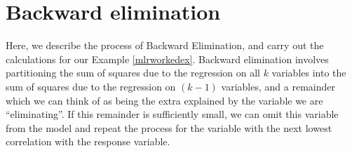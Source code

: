 \documentclass[12pt,a4paper,openany,twoside]{report}
\theoremstyle{definition}
\theoremstyle{remark}
\theoremstyle{plain}
\theoremstyle{definition}
\theoremstyle{definition}
\theoremstyle{definition}
\theoremstyle{remark}
\begin{document}

\hypertarget{backwardelim}{%
\section{Backward elimination}\label{backwardelim}}

Here, we describe the process of Backward Elimination, and carry out the
calculations for our Example \ref{mlrworkedex}.
Backward elimination involves partitioning the sum of squares due to the
regression on all \(k\) variables into the sum of squares due to the
regression on \((k-1)\) variables, and a remainder which we can think of as
being the extra explained by the variable we are ``eliminating''. If this
remainder is sufficiently small, we can omit this variable from the
model and repeat the process for the variable with the next lowest
correlation with the response variable.
\end{document}
